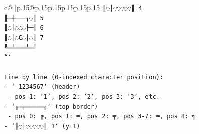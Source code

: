 \documentclass{article}
\begin{document}
{\begin{supertabular}{c@{$\;$}|p{.15\linewidth}@{}p{.15\linewidth}p{.15\linewidth}p{.15\linewidth}p{.15\linewidth}p{.15\linewidth}}
{{{\texttt{║◌│◌◌◌◌◌║ 4} \\
\texttt{╟─┼───┐◌║ 5} \\
\texttt{║◌│◌◌◌├─╢ 6} \\
\texttt{║◌│◌C◌│◌║ 7} \\
\texttt{╚═╧═══╧═╝} \\
\texttt{```} \\
\\ 
\texttt{Line by line (0{-}indexed character position):} \\
\texttt{{-} ` 1234567` (header)} \\
\texttt{  {-} pos 1: '1', pos 2: '2', pos 3: '3', etc.} \\
\texttt{{-} `╔═╤═════╗` (top border)} \\
\texttt{  {-} pos 0: ╔, pos 1: ═, pos 2: ╤, pos 3{-}7: ═, pos 8: ╗} \\
\texttt{{-} `║◌│◌◌◌◌◌║ 1` (y=1)} \\
            }
        }
    }
     \\ \\


\end{supertabular}}
\end{document}
